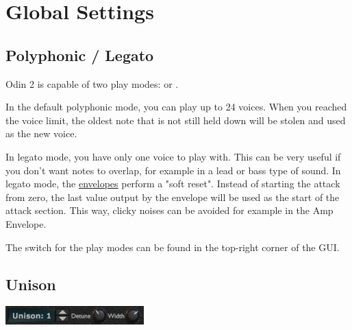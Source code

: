 \chapter{Global Settings}
\label{global}

\section{Polyphonic / Legato}
\label{legato}

Odin 2 is capable of two play modes:  or .

\vspace{3mm}
In the default polyphonic mode, you can play up to 24 voices. When you reached the voice limit, the oldest note that is not still held down will be stolen and used as the new voice.

\vspace{3mm}
In legato mode, you have only one voice to play with. This can be very useful if you don't want notes to overlap, for example in a lead or bass type of sound. In legato mode, the \hyperref[ADSR]{envelopes} perform a "soft reset". Instead of starting the attack from zero, the last value output by the envelope will be used as the start of the attack section. This way, clicky noises can be avoided for example in the Amp Envelope.

\vspace{3mm}
The switch for the play modes can be found in the top-right corner of the GUI.



\clearpage
\section{Unison}
\label{unison}

\begin{center}
    \includegraphics[width=0.4\textwidth]{graphics/unison.png}
\end{center}

